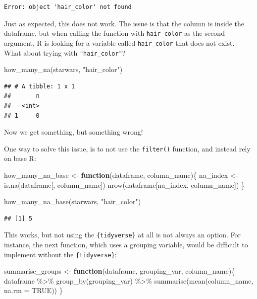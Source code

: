 \documentclass[
]{article}
\newenvironment{Shaded}{\begin{snugshade}}{\end{snugshade}}
\newcommand{\AttributeTok}[1]{\textcolor[rgb]{0.77,0.63,0.00}{#1}}
\newcommand{\ConstantTok}[1]{\textcolor[rgb]{0.00,0.00,0.00}{#1}}
\newcommand{\ControlFlowTok}[1]{\textcolor[rgb]{0.13,0.29,0.53}{\textbf{#1}}}
\newcommand{\FunctionTok}[1]{\textcolor[rgb]{0.00,0.00,0.00}{#1}}
\newcommand{\NormalTok}[1]{#1}
\newcommand{\OtherTok}[1]{\textcolor[rgb]{0.56,0.35,0.01}{#1}}
\newcommand{\SpecialCharTok}[1]{\textcolor[rgb]{0.00,0.00,0.00}{#1}}
\newcommand{\StringTok}[1]{\textcolor[rgb]{0.31,0.60,0.02}{#1}}
\begin{document}
\begin{verbatim}
Error: object 'hair_color' not found
\end{verbatim}

Just as expected, this does not work. The issue is that the column is inside the dataframe,
but when calling the function with \texttt{hair\_color} as the second argument, R is looking for a
variable called \texttt{hair\_color} that does not exist. What about trying with \texttt{"hair\_color"}?

\begin{Shaded}
\begin{Highlighting}[]
\FunctionTok{how\_many\_na}\NormalTok{(starwars, }\StringTok{"hair\_color"}\NormalTok{)}
\end{Highlighting}
\end{Shaded}

\begin{verbatim}
## # A tibble: 1 x 1
##       n
##   <int>
## 1     0
\end{verbatim}

Now we get something, but something wrong!

One way to solve this issue, is to not use the \texttt{filter()} function, and instead rely on base R:

\begin{Shaded}
\begin{Highlighting}[]
\NormalTok{how\_many\_na\_base }\OtherTok{\textless{}{-}} \ControlFlowTok{function}\NormalTok{(dataframe, column\_name)\{}
\NormalTok{  na\_index }\OtherTok{\textless{}{-}} \FunctionTok{is.na}\NormalTok{(dataframe[, column\_name])}
  \FunctionTok{nrow}\NormalTok{(dataframe[na\_index, column\_name])}
\NormalTok{\}}

\FunctionTok{how\_many\_na\_base}\NormalTok{(starwars, }\StringTok{"hair\_color"}\NormalTok{)}
\end{Highlighting}
\end{Shaded}

\begin{verbatim}
## [1] 5
\end{verbatim}

This works, but not using the \texttt{\{tidyverse\}} at all is not always an option. For instance,
the next function, which uses a grouping variable, would be difficult to implement without the
\texttt{\{tidyverse\}}:

\begin{Shaded}
\begin{Highlighting}[]
\NormalTok{summarise\_groups }\OtherTok{\textless{}{-}} \ControlFlowTok{function}\NormalTok{(dataframe, grouping\_var, column\_name)\{}
\NormalTok{  dataframe }\SpecialCharTok{\%\textgreater{}\%}
    \FunctionTok{group\_by}\NormalTok{(grouping\_var) }\SpecialCharTok{\%\textgreater{}\%}  
    \FunctionTok{summarise}\NormalTok{(}\FunctionTok{mean}\NormalTok{(column\_name, }\AttributeTok{na.rm =} \ConstantTok{TRUE}\NormalTok{))}
\NormalTok{\}}
\end{Highlighting}
\end{Shaded}
\end{document}
